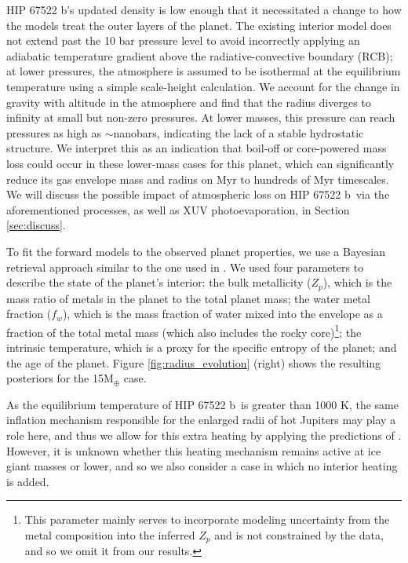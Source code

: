 \documentclass[twocolumn]{aastex63} %
\newcommand{\plname}{HIP 67522 b}
\begin{document}
\plname's updated density is low enough that it necessitated a change to how the models treat the outer layers of the planet. The existing interior model does not extend past the 10 bar pressure level to avoid incorrectly applying an adiabatic temperature gradient above the radiative-convective boundary (RCB); at lower pressures, the atmosphere is assumed to be %
isothermal at the equilibrium temperature using a simple scale-height calculation. We %
account for the change in gravity with altitude in the atmosphere and find that the radius diverges to infinity at small but non-zero pressures. At lower masses, this pressure can reach pressures as high as $\sim$nanobars, indicating the lack of a stable hydrostatic structure. We interpret this as an indication that boil-off \citep[e.g.][]{Owen2016} or core-powered mass loss \citep{Ginzburg2018} could occur in these lower-mass cases for this planet, which can significantly reduce its gas envelope mass and radius on Myr to hundreds of Myr timescales. We will discuss the possible impact of atmospheric loss on \plname\ via the aforementioned processes, as well as XUV photoevaporation, in Section \ref{sec:discuss}. %

To fit the forward models to the observed planet properties, we use a Bayesian retrieval approach similar to the one used in \citet{Thorngren2019}. We used four parameters to describe the state of the planet's interior: the bulk metallicity ($Z_p$), which is the mass ratio of metals in the planet to the total planet mass; the water metal fraction ($f_w$), which is the mass fraction of water mixed into the envelope as a fraction of the total metal mass (which also includes the rocky core)\footnote{This parameter mainly serves to incorporate modeling uncertainty from the metal composition into the inferred $Z_p$ and is not constrained by the data, and so we omit it from our results.};  %
the intrinsic temperature, which is a proxy for the specific entropy of the planet; and the age of the planet. Figure \ref{fig:radius_evolution} (right) shows the resulting posteriors for the 15M$_{\oplus}$ case. 

As the equilibrium temperature of \plname\ is greater than 1000 K, the same inflation mechanism responsible for the enlarged radii of hot Jupiters may play a role here, and thus we allow for this extra heating by applying the predictions of \citet{Thorngren2018}. However, it is unknown whether this heating mechanism remains active at ice giant masses or lower, and so we also consider a case in which no interior heating is added.
\end{document}
